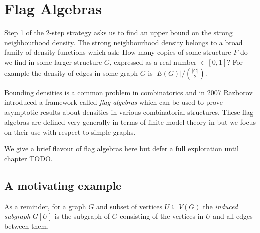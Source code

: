 % 

\section*{Flag Algebras}

Step 1 of the 2-step strategy
asks us to find an upper bound on the strong neighbourhood density. The strong neighbourhood
density belongs to a broad family of density functions which ask: How many copies of some
structure $F$ do we find in some larger structure $G$, expressed as a real number $\in [0,1]$?
For example the density of edges in some graph $G$ is $|E(G)|/\binom{|G|}{2}$.

Bounding densities
is a common problem in combinatorics and in 2007 Razborov \cite{razborovFlagAlgebras2007}
introduced a framework called \textit{flag algebras}
which can be used to prove asymptotic results about densities in various combinatorial structures.
These flag algebras are defined very generally in terms of finite model theory in \cite{razborovFlagAlgebras2007} but we focus on their use with respect to simple graphs.

We give a brief flavour of flag algebras here but defer a full exploration until chapter TODO.

\subsection*{A motivating example}

As a reminder, for a graph $G$ and subset of vertices $U\subseteq V(G)$ the \textit{induced subgraph}
$G[U]$ is the subgraph of $G$ consisting of the vertices in $U$ and all edges between them.

